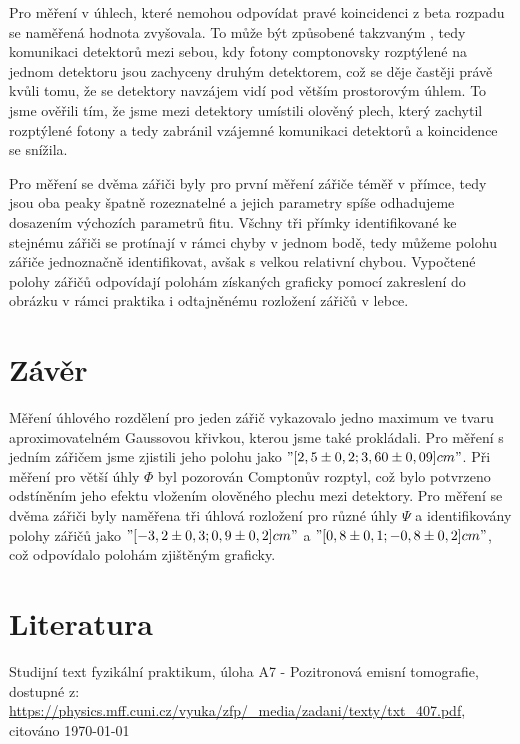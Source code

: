 \documentclass[10pt,a4paper]{article}
\begin{document}
Pro měření v úhlech, které nemohou odpovídat pravé koincidenci z beta rozpadu se naměřená hodnota zvyšovala. To může být způsobené takzvaným , tedy komunikaci detektorů mezi sebou, kdy fotony comptonovsky rozptýlené na jednom detektoru jsou zachyceny druhým detektorem, což se děje častěji právě kvůli tomu, že se detektory navzájem vidí pod větším prostorovým úhlem. To jsme ověřili tím, že jsme mezi detektory umístili olověný plech, který zachytil rozptýlené fotony a tedy zabránil vzájemné komunikaci detektorů a koincidence se snížila.

Pro měření se dvěma zářiči byly pro první měření zářiče téměř v přímce, tedy jsou oba peaky špatně rozeznatelné a jejich parametry spíše odhadujeme dosazením výchozích parametrů fitu. Všchny tři přímky identifikované ke stejnému zářiči se protínají v rámci chyby v jednom bodě, tedy můžeme polohu zářiče jednoznačně identifikovat, avšak s velkou relativní chybou. Vypočtené polohy zářičů odpovídají polohám získaných graficky pomocí zakreslení do obrázku v rámci praktika i odtajněnému rozložení zářičů v lebce. 
\section*{Závěr}
Měření úhlového rozdělení pro jeden zářič vykazovalo jedno maximum ve tvaru aproximovatelném Gaussovou křivkou, kterou jsme také prokládali. Pro měření s jedním zářičem jsme zjistili jeho polohu jako $"[2,5\pm0,2;3,60\pm0,09] cm"$.
Při měření pro větší úhly $\Phi$ byl pozorován Comptonův rozptyl, což bylo potvrzeno odstíněním jeho efektu vložením olověného plechu mezi detektory.
Pro měření se dvěma zářiči byly naměřena tři úhlová rozložení pro různé úhly $\Psi$ a identifikovány polohy zářičů jako $"[-3,2\pm0,3;0,9\pm0,2] cm"$ a $"[0,8\pm0,1;-0,8\pm0,2] cm"$, což odpovídalo polohám zjištěným graficky.
\section*{Literatura}
\begin{thebibliography}{Per00}
Studijní text fyzikální praktikum, úloha A7 - Pozitronová emisní tomografie, dostupné z: \url{https://physics.mff.cuni.cz/vyuka/zfp/_media/zadani/texty/txt_407.pdf}, citováno \today
\end{thebibliography}
\end{document}
